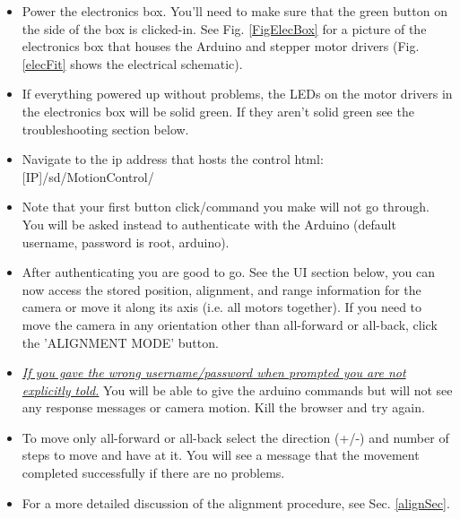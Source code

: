 \documentclass[11pt]{article}
\begin{document}
\begin{itemize}
	\item Power the electronics box.  You'll need to make sure that the green button on the side of the box is clicked-in.
		See Fig. \ref{FigElecBox} for a picture of the electronics box that houses the Arduino and stepper motor drivers (Fig. \ref{elecFit} shows the electrical schematic).  
	\item If everything powered up without problems, the LEDs on the motor drivers in the electronics box will be solid green. 
		If they aren't solid green see the troubleshooting section below.
	\item Navigate to the ip address that hosts the control html: [IP]/sd/MotionControl/
	\item Note that your first button click/command you make will not go through.  
		You will be asked instead to authenticate with the Arduino (default username, password is root, arduino).
	\item After authenticating you are good to go.  
		See the UI section below, you can now access the stored position, alignment, and range information for the camera or move it along its axis (i.e. all motors together).  
		If you need to move the camera in any orientation other than all-forward or all-back, click the 'ALIGNMENT MODE' button. 
	\item \underline{\it If you gave the wrong username/password when prompted you are not explicitly told.}
		You will be able to give the arduino commands but will not see any response messages or camera motion.
		Kill the browser and try again.
	\item To move only all-forward or all-back select the direction (+/-) and number of steps to move and have at it.  
		You will see a message that the movement completed successfully if there are no problems.
	\item For a more detailed discussion of the alignment procedure, see Sec. \ref{alignSec}.
\end{itemize}
\end{document}

